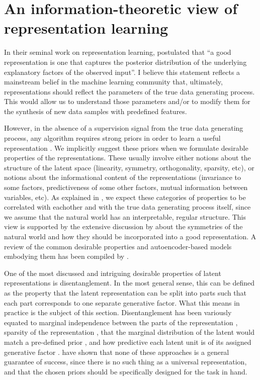 \documentclass[withindex,glossary,firstyr,times]{cam-thesis}
\begin{document}
\section{An information-theoretic view of representation learning}

In their seminal work on representation learning, \citet{bengio2013representation} postulated that ``a good representation is one that captures the posterior distribution of the underlying explanatory factors of the observed input''. I believe this statement reflects a mainstream belief in the machine learning community that, ultimately, representations should reflect the parameters of the true data generating process. This would allow us to understand those parameters and/or to modify them for the synthesis of new data samples with predefined features. 

However, in the absence of a supervision signal from the true data generating process, any algorithm requires strong priors in order to learn a useful representation \cite{locatello2019challenging}. We implicitly suggest these priors when we formulate desirable properties of the representations. These usually involve either notions about the structure of the latent space (linearity, symmetry, orthogonality, sparsity, etc), or notions about the informational content of the representations (invariance to some factors, predictiveness of some other factors, mutual information between variables, etc). As explained in \cite{bengio2013representation}, we expect these categories of properties to be correlated with eachother and with the true data generating process itself, since we assume that the natural world has an interpretable, regular structure. This view is supported by the extensive discussion by \citet{higgins2018towards} about the symmetries of the natural world and how they should be incorporated into a good representation. A review of the common desirable properties and autoencoder-based models embodying them has been compiled by \citet{tschannen2018recent}.

One of the most discussed and intriguing desirable properties of latent representations is disentanglement. In the most general sense, this can be defined as the property that the latent representation can be split into parts such that each part corresponds to one separate generative factor. What this means in practice is the subject of this section. Disentanglement has been variously equated to marginal independence between the parts of the representation \cite{ver2014discovering, kim2018disentangling, chen2018isolating, kumar2017variational}, sparsity of the representation \cite{mathieu2019disentangling}, that the marginal distribution of the latent would match a pre-defined prior \cite{tolstikhin2017wasserstein, makhzani2015adversarial}, and how predictive each latent unit is of its assigned generative factor \cite{higgins2016beta, kim2017learning}. \citet{locatello2019challenging} have shown that none of these approaches is a general guarantee of success, since there is no such thing as a universal representation, and that the chosen priors should be specifically designed for the task in hand.
\end{document}
